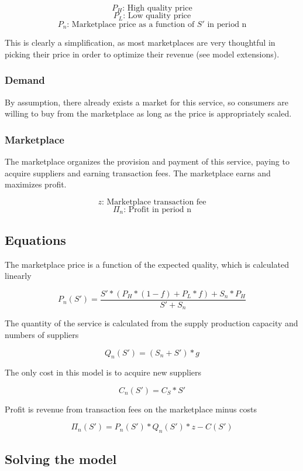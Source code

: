 \[P_H \textrm{: High quality price}\]
\[P_L \textrm{: Low quality price}\]
\[P_n \textrm{: Marketplace price as a function of } S' \textrm{ in period n}\]

This is clearly a simplification, as most marketplaces are very thoughtful in picking their price in order to optimize their revenue (see model extensions).

\subsubsection{Demand}

By assumption, there already exists a market for this service, so consumers are willing to buy from the marketplace as long as the price is appropriately scaled.

\subsubsection{Marketplace}

The marketplace organizes the provision and payment of this service, paying to acquire suppliers and earning transaction fees. The marketplace earns and maximizes profit.

\[z \textrm{: Marketplace transaction fee}\]
\[\Pi_n \textrm{: Profit in period n}\]

\subsection{Equations}

The marketplace price is a function of the expected quality, which is calculated linearly

\[P_n(S') = \dfrac{S'*(P_H*(1-f) + P_L*f) + S_n * P_H}{S' + S_n} \]

\vspace{5 mm}
The quantity of the service is calculated from the supply production capacity and numbers of suppliers

\[Q_n(S') = (S_n + S') * g \]

\vspace{5 mm}
The only cost in this model is to acquire new suppliers

\[C_n(S') = C_S * S' \]

\vspace{5 mm}
Profit is revenue from transaction fees on the marketplace minus costs

\[\Pi_n(S') = P_n(S') * Q_n(S') * z - C(S') \]


\subsection{Solving the model}

